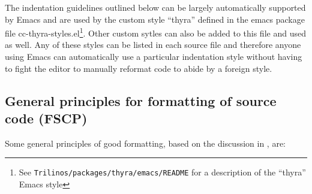 The indentation guidelines outlined below can be largely automatically
supported by Emacs and are used by the custom style ``thyra'' defined in the
emacs package file cc-thyra-styles.el\footnote{See
{}\texttt{Trilinos/packages/thyra/emacs/README} for a description of the
``thyra'' Emacs style}.  Other custom sytles can also be added to this file
and used as well.  Any of these styles can be listed in each source file and
therefore anyone using Emacs can automatically use a particular indentation
style without having to fight the editor to manually reformat code to abide by
a foreign style.

%
\subsection{General principles for formatting of source code (FSCP)}
%

Some general principles of good formatting, based on the discussion in
{}\cite[Section 31.1]{CodeComplete2nd04}, are:

